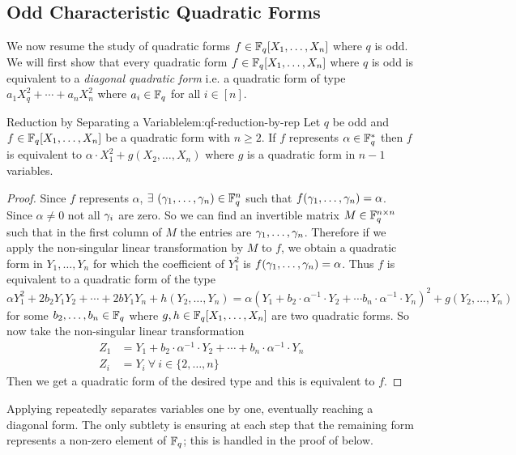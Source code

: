 \subsection{Odd Characteristic Quadratic Forms}
%
We now resume the study of quadratic forms $f\in\mathbb{F}_q[X_1,\dots,X_n]$ where $q$ is odd. We will first show that every quadratic form $f\in\mathbb{F}_q[X_1,\dots,X_n]$ where $q$ is odd is equivalent to a \emph{diagonal quadratic form} i.e. a quadratic form of type $a_1X_q^2+\cdots+a_nX_n^2$ where $a_i\in\mathbb{F}_q$ for all $i\in[n]$. 
\begin{lemma}{Reduction by Separating a Variable}{lem:qf-reduction-by-rep}
  Let $q$ be odd and $f\in\mathbb{F}_q[X_1,\dots,X_n]$ be a quadratic form with $n\geq 2$. If $f$ represents $\alpha\in\mathbb{F}_q^*$ then $f$ is equivalent to $\alpha\cdot X_1^2+g(X_2,\dots, X_n)$ where $g$ is a quadratic form in $n-1$ variables.
\end{lemma}
\begin{proof}
  Since $f$ represents $\alpha$, $\exists\ (\gamma_1,\dots,\gamma_n)\in\mathbb{F}_q^n$ such that $f(\gamma_1,\dots, \gamma_n)=\alpha$. Since $\alpha\neq 0$ not all $\gamma_i$ are zero. So we can find an invertible matrix $M\in\mathbb{F}_q^{n\times n}$ such that in the first column of $M$ the entries are $\gamma_1,\dots,\gamma_n$. Therefore if we apply the non-singular linear transformation by $M$ to $f$, we obtain a quadratic form in $Y_1,\dots, Y_n$ for which the coefficient of $Y_1^2$ is $f(\gamma_1,\dots, \gamma_n)=\alpha$. Thus $f$ is equivalent to a quadratic form of the type $$\alpha Y_1^2+2b_2Y_1Y_2+\cdots +2bY_1Y_n+h(Y_2,\dots, Y_n)=\alpha(Y_1+b_2\cdot \alpha^{-1}\cdot Y_2+\cdots b_n\cdot \alpha^{-1}\cdot Y_n)^2+g(Y_2,\dots, Y_n)$$ for some $b_2,\dots, b_n\in\mathbb{F}_q$ where $g,h\in\mathbb{F}_q[X_1,\dots,X_n]$ are two quadratic forms. So now take the non-singular linear transformation \begin{align*}
    Z_1 & = Y_1+b_2\cdot \alpha^{-1}\cdot Y_2+\cdots +b_n\cdot \alpha^{-1}\cdot Y_n&&\\ 
    Z_i & = Y_i\ \forall\ i\in\{2,\dots, n\}&&
  \end{align*}Then we get a quadratic form of the desired type and this is equivalent to $f$. 
\end{proof}

Applying \QFRedlem repeatedly separates variables one by one, eventually reaching a diagonal form. The only subtlety is ensuring at each step that the remaining form represents a non-zero element of $\mathbb{F}_q$; this is handled in the proof of \QFDiagthm below.


